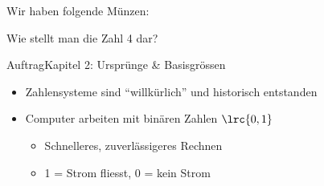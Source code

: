 \begin{frame}
Wir haben folgende Münzen: 
\vspace{3mm}
\begin{center}
Wie stellt man die Zahl 4 dar?
\end{center}
\end{frame}

\begin{frame}{Auftrag}{Kapitel 2: Ursprünge \& Basisgrössen}
\vspace{3mm}
\end{frame}

{
\begin{frame}
\end{frame}}

\begin{frame}
\begin{itemize}[<+->]\setlength\itemsep{6pt}
  \item Zahlensysteme sind \enquote{willkürlich} und historisch entstanden
  \item Computer arbeiten mit binären Zahlen $\lrc{0,1}$
  \begin{itemize}
    \item Schnelleres, zuverlässigeres Rechnen
    \item {} 1 = Strom fliesst, 0 = kein Strom
  \end{itemize}
\end{itemize}
\end{frame}

